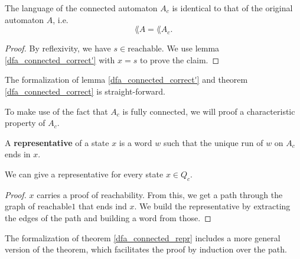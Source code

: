 \begin{theorem}
    \label{dfa_connected_correct}
    The language of the connected automaton $A_c$ is identical to that of the original automaton $A$, i.e.
    \begin{equation*}
        \lang{A} = \lang{A_c}.        
    \end{equation*}
\end{theorem}

\begin{proof}
    By reflexivity, we have $s \in \mathrm{reachable}$. 
    We use lemma \ref{dfa_connected_correct'} with $x = s$ to prove the claim.
\end{proof}


The formalization of lemma \ref{dfa_connected_correct'} and theorem \ref{dfa_connected_correct} is straight-forward.



To make use of the fact that $A_c$ is fully connected, we will proof a characteristic property of $A_c$. 

\begin{definition}
    A \textbf{representative} of a state $x$ is a word $w$ such that the unique run of $w$ on $A_c$ ends in $x$.
\end{definition}

\begin{lemma}
    \label{dfa_connected_repr}
    We can give a representative for every state $x \in Q_c$.
\end{lemma}

\begin{proof}
    $x$ carries a proof of reachability.
    From this, we get a path through the graph of $\mathrm{reachable1}$ that ends ind $x$.
    We build the representative by extracting the edges of the path and building a word from those.
\end{proof}


The formalization of theorem \ref{dfa_connected_repr} includes a more general version of the theorem, 
which facilitates the proof by induction over the path.



